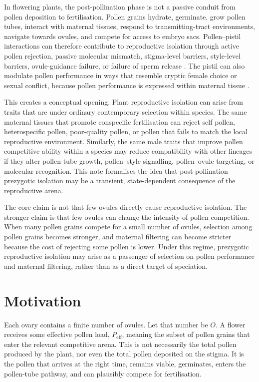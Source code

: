 \documentclass[11pt]{article}
\newcommand{\Peff}{P_{\mathrm{eff}}}
\begin{document}
In flowering plants, the post-pollination phase is not a passive conduit from pollen deposition to fertilisation. Pollen grains hydrate, germinate, grow pollen tubes, interact with maternal tissues, respond to transmitting-tract environments, navigate towards ovules, and compete for access to embryo sacs. Pollen--pistil interactions can therefore contribute to reproductive isolation through active pollen rejection, passive molecular mismatch, stigma-level barriers, style-level barriers, ovule-guidance failure, or failure of sperm release \citep{Baack2015,Wang2023}. The pistil can also modulate pollen performance in ways that resemble cryptic female choice or sexual conflict, because pollen performance is expressed within maternal tissue \citep{LankinenGreen2015,Lora2016}.

This creates a conceptual opening. Plant reproductive isolation can arise from traits that are under ordinary contemporary selection within species. The same maternal tissues that promote conspecific fertilisation can reject self pollen, heterospecific pollen, poor-quality pollen, or pollen that fails to match the local reproductive environment. Similarly, the same male traits that improve pollen competitive ability within a species may reduce compatibility with other lineages if they alter pollen-tube growth, pollen--style signalling, pollen--ovule targeting, or molecular recognition. This note formalises the idea that post-pollination prezygotic isolation may be a transient, state-dependent consequence of the reproductive arena.

The core claim is not that few ovules directly cause reproductive isolation. The stronger claim is that few ovules can change the intensity of pollen competition. When many pollen grains compete for a small number of ovules, selection among pollen grains becomes stronger, and maternal filtering can become stricter because the cost of rejecting some pollen is lower. Under this regime, prezygotic reproductive isolation may arise as a passenger of selection on pollen performance and maternal filtering, rather than as a direct target of speciation.

\section{Motivation}

Each ovary contains a finite number of ovules. Let that number be \(O\). A flower receives some effective pollen load, \(\Peff\), meaning the subset of pollen grains that enter the relevant competitive arena. This is not necessarily the total pollen produced by the plant, nor even the total pollen deposited on the stigma. It is the pollen that arrives at the right time, remains viable, germinates, enters the pollen-tube pathway, and can plausibly compete for fertilisation.
\end{document}
